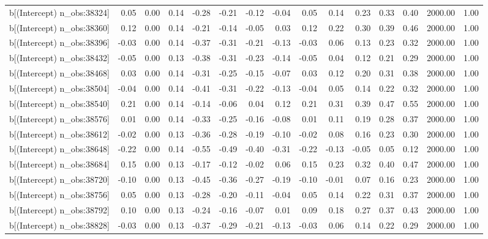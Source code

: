 \begin{table}[ht]
\begin{tabular}{rrrrrrrrrrrrrrr}
  b[(Intercept) n\_obs:38324] & 0.05 & 0.00 & 0.14 & -0.28 & -0.21 & -0.12 & -0.04 & 0.05 & 0.14 & 0.23 & 0.33 & 0.40 & 2000.00 & 1.00 \\ 
  b[(Intercept) n\_obs:38360] & 0.12 & 0.00 & 0.14 & -0.21 & -0.14 & -0.05 & 0.03 & 0.12 & 0.22 & 0.30 & 0.39 & 0.46 & 2000.00 & 1.00 \\ 
  b[(Intercept) n\_obs:38396] & -0.03 & 0.00 & 0.14 & -0.37 & -0.31 & -0.21 & -0.13 & -0.03 & 0.06 & 0.13 & 0.23 & 0.32 & 2000.00 & 1.00 \\ 
  b[(Intercept) n\_obs:38432] & -0.05 & 0.00 & 0.13 & -0.38 & -0.31 & -0.23 & -0.14 & -0.05 & 0.04 & 0.12 & 0.21 & 0.29 & 2000.00 & 1.00 \\ 
  b[(Intercept) n\_obs:38468] & 0.03 & 0.00 & 0.14 & -0.31 & -0.25 & -0.15 & -0.07 & 0.03 & 0.12 & 0.20 & 0.31 & 0.38 & 2000.00 & 1.00 \\ 
  b[(Intercept) n\_obs:38504] & -0.04 & 0.00 & 0.14 & -0.41 & -0.31 & -0.22 & -0.13 & -0.04 & 0.05 & 0.14 & 0.22 & 0.32 & 2000.00 & 1.00 \\ 
  b[(Intercept) n\_obs:38540] & 0.21 & 0.00 & 0.14 & -0.14 & -0.06 & 0.04 & 0.12 & 0.21 & 0.31 & 0.39 & 0.47 & 0.55 & 2000.00 & 1.00 \\ 
  b[(Intercept) n\_obs:38576] & 0.01 & 0.00 & 0.14 & -0.33 & -0.25 & -0.16 & -0.08 & 0.01 & 0.11 & 0.19 & 0.28 & 0.37 & 2000.00 & 1.00 \\ 
  b[(Intercept) n\_obs:38612] & -0.02 & 0.00 & 0.13 & -0.36 & -0.28 & -0.19 & -0.10 & -0.02 & 0.08 & 0.16 & 0.23 & 0.30 & 2000.00 & 1.00 \\ 
  b[(Intercept) n\_obs:38648] & -0.22 & 0.00 & 0.14 & -0.55 & -0.49 & -0.40 & -0.31 & -0.22 & -0.13 & -0.05 & 0.05 & 0.12 & 2000.00 & 1.00 \\ 
  b[(Intercept) n\_obs:38684] & 0.15 & 0.00 & 0.13 & -0.17 & -0.12 & -0.02 & 0.06 & 0.15 & 0.23 & 0.32 & 0.40 & 0.47 & 2000.00 & 1.00 \\ 
  b[(Intercept) n\_obs:38720] & -0.10 & 0.00 & 0.13 & -0.45 & -0.36 & -0.27 & -0.19 & -0.10 & -0.01 & 0.07 & 0.16 & 0.23 & 2000.00 & 1.00 \\ 
  b[(Intercept) n\_obs:38756] & 0.05 & 0.00 & 0.13 & -0.28 & -0.20 & -0.11 & -0.04 & 0.05 & 0.14 & 0.22 & 0.31 & 0.37 & 2000.00 & 1.00 \\ 
  b[(Intercept) n\_obs:38792] & 0.10 & 0.00 & 0.13 & -0.24 & -0.16 & -0.07 & 0.01 & 0.09 & 0.18 & 0.27 & 0.37 & 0.43 & 2000.00 & 1.00 \\ 
  b[(Intercept) n\_obs:38828] & -0.03 & 0.00 & 0.13 & -0.37 & -0.29 & -0.21 & -0.13 & -0.03 & 0.06 & 0.14 & 0.22 & 0.29 & 2000.00 & 1.00 \\ 

\end{tabular}
\end{table}
